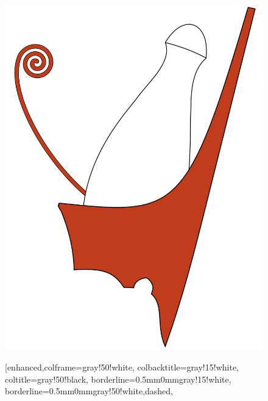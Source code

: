 \begin{figure}[H]
	\centering
	\begin{minipage}{0.44\textwidth}
		\begin{tcolorbox}[enhanced,colframe=gray!50!white,
			colbacktitle=gray!15!white,
			coltitle=gray!50!black,
			borderline={0.5mm}{0mm}{gray!15!white},
			borderline={0.5mm}{0mm}{gray!50!white,dashed},
			attach boxed title to top center={yshift=-2mm},
			boxed title style={boxrule=0.4pt},
			title=Kettős korona]{
				\includegraphics[width=1.0\linewidth]{images/01/kettos_korona}}
		\end{tcolorbox}
	\end{minipage}
	\hfill
	\begin{minipage}{0.44\textwidth}
		\begin{tcolorbox}[enhanced,colframe=gray!50!white,
			colbacktitle=gray!15!white,
			coltitle=gray!50!black,
			borderline={0.5mm}{0mm}{gray!15!white},
			borderline={0.5mm}{0mm}{gray!50!white,dashed},

\end{tcolorbox}
\end{minipage}
\end{figure}
